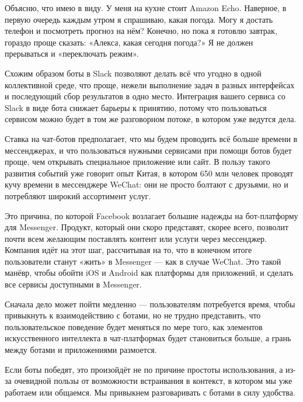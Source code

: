 Объясню, что имею в виду. У меня на кухне стоит Amazon Echo. Наверное, в первую очередь каждым утром я спрашиваю, какая погода. Могу я достать телефон и посмотреть прогноз на нём? Конечно, но пока я готовлю завтрак, гораздо проще сказать: «Алекса, какая сегодня погода?» Я не должен прерываться и «переключать режим».

Схожим образом боты в Slack позволяют делать всё что угодно в одной коллективной среде, что проще, нежели выполнение задач в разных интерфейсах и последующий сбор результатов в одно место. Интеграция вашего сервиса со Slack в виде бота снижает барьеры к принятию, потому что пользоваться сервисом можно будет в том же разговорном потоке, в котором уже ведутся дела.

Ставка на чат-ботов предполагает, что мы будем проводить всё больше времени в мессенджерах, и что пользоваться нужными сервисами при помощи ботов будет проще, чем открывать специальное приложение или сайт. В пользу такого развития событий уже говорит опыт Китая, в котором 650 млн человек проводят кучу времени в мессенджере WeChat: они не просто болтают с друзьями, но и потребляют широкий ассортимент услуг.

Это причина, по которой Facebook возлагает большие надежды на бот-платформу для Messenger. Продукт, который они скоро представят, скорее всего, позволит почти всем желающим поставлять контент или услуги через мессенджер. Компания идёт на этот шаг, рассчитывая на то, что в конечном итоге пользователи станут «жить» в Messenger — как в случае WeChat. Это такой манёвр, чтобы обойти iOS и Android как платформы для приложений, и сделать все сервисы доступными в Messenger.

Сначала дело может пойти медленно — пользователям потребуется время, чтобы привыкнуть к взаимодействию с ботами, но не трудно представить, что пользовательское поведение будет меняться по мере того, как элементов искусственного интеллекта в чат-платформах будет становиться больше, а грань между ботами и приложениями размоется.

Если боты победят, это произойдёт не по причине простоты использования, а из-за очевидной пользы от возможности встраивания в контекст, в котором мы уже работаем или общаемся. Мы привыкнем разговаривать с ботами в силу удобства.